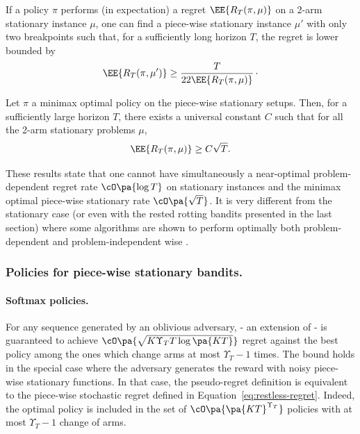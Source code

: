\begin{proposition}
\label{prop:garivier-lb}
If a policy $\pi$ performs (in expectation) a regret $\EE{R_T(\pi, \mu)}$ on a 2-arm stationary instance $\mu$, one can find a piece-wise stationary instance $\mu'$ with only two breakpoints such that, for a sufficiently long horizon $T$, the regret is lower bounded by 
\[\EE{R_T(\pi, \mu')} \geq \frac{T}{22\EE{R_T(\pi, \mu)}}\,\cdot\]  
\end{proposition}

\begin{corollary}
\label{cor:garivier-lb}
Let $\pi$ a minimax optimal policy on the piece-wise stationary setups. Then, for a sufficiently large horizon $T$, there exists a universal constant $C$ such that for all the 2-arm stationary problems $\mu$, 
\[
\EE{R_T(\pi,\mu)} \geq C\sqrt{T}.
\]
\end{corollary}

These results state that one cannot have simultaneously a near-optimal problem-dependent regret rate $\cO\pa{\log{T}}$ on stationary instances and the minimax optimal piece-wise stationary rate $\cO\pa{\sqrt{T}}$. It is very different from the stationary case (or even with the rested rotting bandits presented in the last section) where some algorithms are shown to perform optimally both problem-dependent and problem-independent wise \citep{lattimore2018refining, menard2017klucb++}.

\subsubsection{Policies for piece-wise stationary bandits.}
\paragraph{Softmax policies.} For any sequence generated by an oblivious adversary, \EXPS \citep{auer2002nonstochastic} - an extension of \EXP - is guaranteed to achieve $\cO\pa{\sqrt{K\Upsilon_T T\log\pa{KT}}}$ regret against the best policy among the ones which change arms at most $\Upsilon_T -1$ times. The bound holds in the special case where the adversary generates the reward with noisy piece-wise stationary functions. In that case, the pseudo-regret definition is equivalent to the piece-wise stochastic regret defined in Equation~\ref{eq:restless-regret}. Indeed, the optimal policy is included in the set of $\cO\pa{\pa{KT}^{\Upsilon_T}}$ policies with at most $\Upsilon_T-1$ change of arms. 


